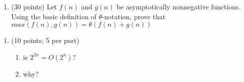 \documentclass{article}
\begin{document}
    \begin{enumerate}[label=\textbf{Q3}]
        \item (30 points) Let $f(n)$ and $g(n)$ be asymptotically nonnegative functions. Using the basic
        definition of $\theta$-notation, prove that $max(f(n),g(n))= \theta(f(n)+g(n))$
    \end{enumerate}

    \begin{enumerate}[label=\textbf{Q4}]
        \item (10 points; 5 per part)
        \begin{enumerate}[label=(\alph*)]
            \item is $2^{2n} = O(2^n)$?
            \item why?
        \end{enumerate}
    \end{enumerate}
\end{document}
